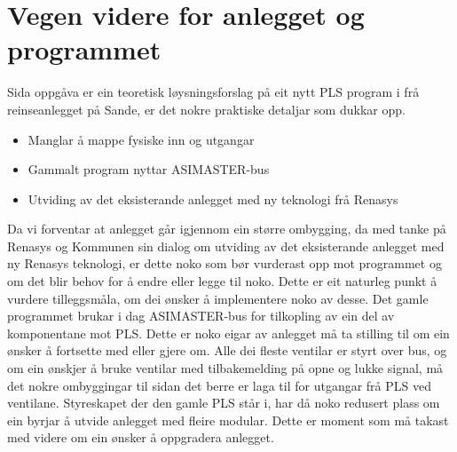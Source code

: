 \section{Vegen videre for anlegget og programmet}
\thispagestyle{fancy}

Sida oppgåva er ein teoretisk løysningsforslag på eit nytt PLS program i frå reinseanlegget på Sande, er det nokre praktiske detaljar som dukkar opp.

\begin{itemize}
    \item Manglar å mappe fysiske inn og utgangar
    \item Gammalt program nyttar ASIMASTER-bus  
    \item Utviding av det eksisterande anlegget med ny teknologi frå Renasys
\end{itemize}

Da vi forventar at anlegget går igjennom ein større ombygging,  da med tanke på Renasys og Kommunen sin dialog om utviding av det eksisterande anlegget med ny Renasys teknologi, er dette noko som bør vurderast opp mot programmet og om det blir behov for å endre eller legge til noko. 
Dette er eit naturleg punkt å vurdere tilleggsmåla, om dei ønsker å implementere noko av desse.
Det gamle programmet brukar i dag ASIMASTER-bus for tilkopling av ein del av komponentane mot PLS. 
Dette er noko eigar av anlegget må ta stilling til om ein ønsker å fortsette med eller gjere om. Alle dei fleste ventilar er styrt over bus, og om ein ønskjer å bruke ventilar med tilbakemelding på opne og lukke signal, må det nokre ombyggingar til sidan det berre er laga til for utgangar frå PLS ved ventilane.
Styreskapet der den gamle PLS står i, har då noko redusert plass om ein byrjar å utvide anlegget med fleire modular. 
Dette er moment som må takast med videre om ein ønsker å oppgradera anlegget. 


